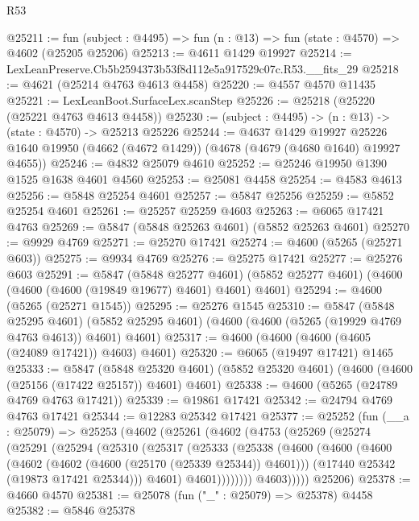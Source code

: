 \begin{lexlean}{R53}
\begin{coremodule}
@25211 := fun (subject : @4495) => fun (n : @13) => fun (state : @4570) => @4602 (@25205 @25206)
@25213 := @4611 @1429 @19927
@25214 := LexLeanPreserve.Cb5b2594373b53f8d112e5a917529c07c.R53.__fits_29
@25218 := @4621 (@25214 @4763 @4613 @4458)
@25220 := @4557 @4570 @11435
@25221 := LexLeanBoot.SurfaceLex.scanStep
@25226 := @25218 (@25220 (@25221 @4763 @4613 @4458))
@25230 := (subject : @4495) -> (n : @13) -> (state : @4570) -> @25213 @25226
@25244 := @4637
    @1429
    @19927
    @25226
    @1640
    @19950
    (@4662 (@4672 @1429))
    (@4678 (@4679 (@4680 @1640) @19927 @4655))
@25246 := @4832 @25079 @4610
@25252 := @25246 @19950 @1390 @1525 @1638 @4601 @4560
@25253 := @25081 @4458
@25254 := @4583 @4613
@25256 := @5848 @25254 @4601
@25257 := @5847 @25256
@25259 := @5852 @25254 @4601
@25261 := @25257 @25259 @4603
@25263 := @6065 @17421 @4763
@25269 := @5847 (@5848 @25263 @4601) (@5852 @25263 @4601)
@25270 := @9929 @4769
@25271 := @25270 @17421
@25274 := @4600 (@5265 (@25271 @603))
@25275 := @9934 @4769
@25276 := @25275 @17421
@25277 := @25276 @603
@25291 := @5847
    (@5848 @25277 @4601)
    (@5852 @25277 @4601)
    (@4600 (@4600 (@4600 (@19849 @19677) @4601) @4601) @4601)
@25294 := @4600 (@5265 (@25271 @1545))
@25295 := @25276 @1545
@25310 := @5847
    (@5848 @25295 @4601)
    (@5852 @25295 @4601)
    (@4600 (@4600 (@5265 (@19929 @4769 @4763 @4613)) @4601) @4601)
@25317 := @4600 (@4600 (@4600 (@4605 (@24089 @17421)) @4603) @4601)
@25320 := @6065 (@19497 @17421) @1465
@25333 := @5847
    (@5848 @25320 @4601)
    (@5852 @25320 @4601)
    (@4600 (@4600 (@25156 (@17422 @25157)) @4601) @4601)
@25338 := @4600 (@5265 (@24789 @4769 @4763 @17421))
@25339 := @19861 @17421
@25342 := @24794 @4769 @4763 @17421
@25344 := @12283 @25342 @17421
@25377 := @25252
    (fun (__a : @25079) =>
    @25253
      (@4602
        (@25261
          (@4602
            (@4753
              (@25269
                (@25274
                  (@25291
                    (@25294
                      (@25310
                        (@25317
                          (@25333
                            (@25338
                              (@4600
                                (@4600
                                  (@4600
                                    (@4602 (@4602 (@4600 (@25170 (@25339 @25344)) @4601)))
                                    (@17440 @25342 (@19873 @17421 @25344)))
                                  @4601)
                                @4601))))))))
                @4603)))))
      @25206)
@25378 := @4660 @4570
@25381 := @25078 (fun ("_" : @25079) => @25378) @4458
@25382 := @5846 @25378

\end{coremodule}
\end{lexlean}
